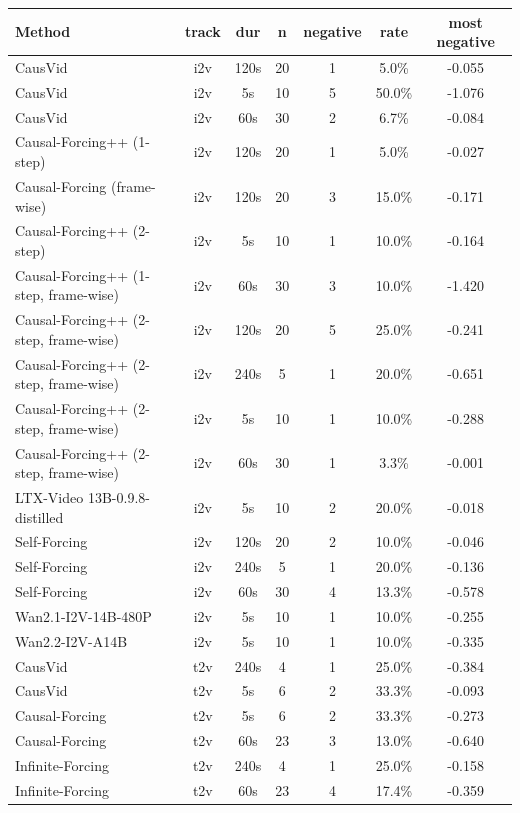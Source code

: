 \begin{table}[!htbp]
\centering
\tiny
\setlength{\tabcolsep}{5pt}
\begin{tabular}{lcccccc}
\toprule
Method & track & dur & n & negative & rate & most negative \\
\midrule
CausVid & i2v & 120s & 20 & 1 & 5.0\% & -0.055 \\
CausVid & i2v & 5s & 10 & 5 & 50.0\% & -1.076 \\
CausVid & i2v & 60s & 30 & 2 & 6.7\% & -0.084 \\
Causal-Forcing++ (1-step) & i2v & 120s & 20 & 1 & 5.0\% & -0.027 \\
Causal-Forcing (frame-wise) & i2v & 120s & 20 & 3 & 15.0\% & -0.171 \\
Causal-Forcing++ (2-step) & i2v & 5s & 10 & 1 & 10.0\% & -0.164 \\
Causal-Forcing++ (1-step, frame-wise) & i2v & 60s & 30 & 3 & 10.0\% & -1.420 \\
Causal-Forcing++ (2-step, frame-wise) & i2v & 120s & 20 & 5 & 25.0\% & -0.241 \\
Causal-Forcing++ (2-step, frame-wise) & i2v & 240s & 5 & 1 & 20.0\% & -0.651 \\
Causal-Forcing++ (2-step, frame-wise) & i2v & 5s & 10 & 1 & 10.0\% & -0.288 \\
Causal-Forcing++ (2-step, frame-wise) & i2v & 60s & 30 & 1 & 3.3\% & -0.001 \\
LTX-Video 13B-0.9.8-distilled & i2v & 5s & 10 & 2 & 20.0\% & -0.018 \\
Self-Forcing & i2v & 120s & 20 & 2 & 10.0\% & -0.046 \\
Self-Forcing & i2v & 240s & 5 & 1 & 20.0\% & -0.136 \\
Self-Forcing & i2v & 60s & 30 & 4 & 13.3\% & -0.578 \\
Wan2.1-I2V-14B-480P & i2v & 5s & 10 & 1 & 10.0\% & -0.255 \\
Wan2.2-I2V-A14B & i2v & 5s & 10 & 1 & 10.0\% & -0.335 \\
CausVid & t2v & 240s & 4 & 1 & 25.0\% & -0.384 \\
CausVid & t2v & 5s & 6 & 2 & 33.3\% & -0.093 \\
Causal-Forcing & t2v & 5s & 6 & 2 & 33.3\% & -0.273 \\
Causal-Forcing & t2v & 60s & 23 & 3 & 13.0\% & -0.640 \\
Infinite-Forcing & t2v & 240s & 4 & 1 & 25.0\% & -0.158 \\
Infinite-Forcing & t2v & 60s & 23 & 4 & 17.4\% & -0.359 \\

\end{tabular}
\end{table}
